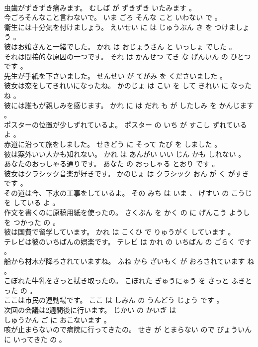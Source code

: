 \documentclass[8pt]{extreport}
\begin{document}
\begin{CJK}{UTF8}{min}
\\	虫歯がずきずき痛みます。	むしば が ずきずき いたみます 。 
\\	今ごろそんなこと言わないで。	いま ごろ そんな こと いわない で 。 
\\	衛生には十分気を付けましょう。	えいせい に は じゅうぶん き を つけましょう 。 
\\	彼はお嬢さんと一緒でした。	かれ は おじょうさん と いっしょ でした 。 
\\	それは間接的な原因の一つです。	それ は かんせつ てき な げんいん の ひとつ です 。 
\\	先生が手紙を下さいました。	せんせい が てがみ を くださいました 。 
\\	彼女は恋をしてきれいになったね。	かのじょ は こい を して きれい に なった ね 。 
\\	彼には誰もが親しみを感じます。	かれ に は だれ も が したしみ を かんじます 。 
\\	ポスターの位置が少しずれているよ。	ポスター の いち が すこし ずれている よ 。 
\\	赤道に沿って旅をしました。	せきどう に そって たび を しました 。 
\\	彼は案外いい人かも知れない。	かれ は あんがい いい じん かも しれない 。 
\\	あなたのおっしゃる通りです。	あなた の おっしゃる とおり です 。 
\\	彼女はクラシック音楽が好きです。	かのじょ は クラシック おん が く がすき です 。 
\\	その道は今、下水の工事をしているよ。	その みち は いま 、 げすい の こうじ を している よ 。 
\\	作文を書くのに原稿用紙を使ったの。	さくぶん を かく の に げんこう ようし を つかった の 。 
\\	彼は国費で留学しています。	かれ は こくひ で りゅうがく しています 。 
\\	テレビは彼のいちばんの娯楽です。	テレビ は かれ の いちばん の ごらく です 。 
\\	船から材木が降ろされていますね。	ふね から ざいもく が おろされています ね 。 
\\	こぼれた牛乳をさっと拭き取ったの。	こぼれた ぎゅうにゅう を さっと ふきとった の 。 
\\	ここは市民の運動場です。	ここ は しみん の うんどう じょう です 。 
\\	次回の会議は2週間後に行います。	じかい の かいぎ は 
\\	しゅうかん ご に おこないます 。 
\\	咳が止まらないので病院に行ってきたの。	せき が とまらない ので びょういん に いってきた の 。 

\end{CJK}
\end{document}
